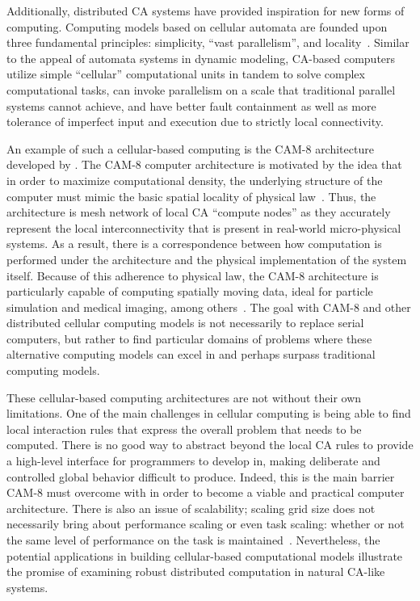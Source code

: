 \documentclass[a4paper,11pt,twoside]{report}
\begin{document}
Additionally, distributed CA systems have provided inspiration for new forms of computing. Computing models based on cellular automata are founded upon three fundamental principles: simplicity, ``vast parallelism'', and locality~\cite{si99}. Similar to the appeal of automata systems in dynamic modeling, CA-based computers utilize simple ``cellular'' computational units in tandem to solve complex computational tasks, can invoke parallelism on a scale that traditional parallel systems cannot achieve, and have better fault containment as well as more tolerance of imperfect input and execution due to strictly local connectivity.

An example of such a cellular-based computing is the CAM-8 architecture developed by \citeauthor{ma96}. The CAM-8 computer architecture is motivated by the idea that in order to maximize computational density, the underlying structure of the computer must mimic the basic spatial locality of physical law~\cite{ma96}. Thus, the architecture is mesh network of local CA ``compute nodes'' as they accurately represent the local interconnectivity that is present in real-world micro-physical systems. As a result, there is a correspondence between how computation is performed under the architecture and the physical implementation of the system itself. Because of this adherence to physical law, the CAM-8 architecture is particularly capable of computing spatially moving data, ideal for particle simulation and medical imaging, among others~\cite{ma96}. The goal with CAM-8 and other distributed cellular computing models is not necessarily to replace serial computers, but rather to find particular domains of problems where these alternative computing models can excel in and perhaps surpass traditional computing models.

These cellular-based computing architectures are not without their own limitations. One of the main challenges in cellular computing is being able to find local interaction rules that express the overall problem that needs to be computed. There is no good way to abstract beyond the local CA rules to provide a high-level interface for programmers to develop in, making deliberate and controlled global behavior difficult to produce. Indeed, this is the main barrier CAM-8 must overcome with in order to become a viable and practical computer architecture. There is also an issue of scalability; scaling grid size does not necessarily bring about performance scaling or even task scaling: whether or not the same level of performance on the task is maintained~\cite{si99}. Nevertheless, the potential applications in building cellular-based computational models illustrate the promise of examining robust distributed computation in natural CA-like systems.
\end{document}
